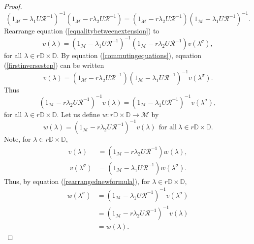 \documentclass[10pt,a4paper]{amsart}
\begin{document}
\begin{proof}
\begin{equation}\label{commutingequations}
(1_{\mathcal{M}}-\lambda_{1}U\mathcal{R}^{-1})^{-1}(1_{\mathcal{M}}-r\lambda_{2}U\mathcal{R}^{-1}) = (1_{\mathcal{M}}-r\lambda_{2}U\mathcal{R}^{-1})(1_{\mathcal{M}}-\lambda_{1}U\mathcal{R}^{-1})^{-1}.
\end{equation}
Rearrange equation (\ref{equalitybetweenextension}) to
\begin{equation}\label{firstinversestep}
v({\lambda}) = (1_{\mathcal{M}}-\lambda_{1}U\mathcal{R}^{-1})^{-1}(1_{\mathcal{M}}-r\lambda_{2}U\mathcal{R}^{-1})v({\lambda}^{\sigma}),
\end{equation}
for all $\lambda \in r\mathbb{D}\times\mathbb{D}$.
By equation (\ref{commutingequations}), equation (\ref{firstinversestep}) can be written
\begin{equation}\label{rearrangednewformula-1}
 v({\lambda}) =  (1_{\mathcal{M}}-r\lambda_{2}U\mathcal{R}^{-1})(1_{\mathcal{M}}-\lambda_{1}U\mathcal{R}^{-1})^{-1}v({\lambda}^{\sigma}).
\end{equation}
Thus
\begin{equation}\label{rearrangednewformula}
 (1_{\mathcal{M}}-r\lambda_{2}U\mathcal{R}^{-1})^{-1}v({\lambda}) = (1_{\mathcal{M}}-\lambda_{1}U\mathcal{R}^{-1})^{-1}v({\lambda}^{\sigma}),
\end{equation}
for all $\lambda \in r\mathbb{D}\times\mathbb{D}$.
Let us define $w: r\mathbb{D}\times\mathbb{D}\rightarrow \mathcal{M}$ by
\begin{equation}\label{wequation}
w(\lambda)=(1_{\mathcal{M}}-r\lambda_{2}U\mathcal{R}^{-1})^{-1}v({\lambda})~~\text{for all}~\lambda \in r\mathbb{D}\times \mathbb{D}.
\end{equation}
Note, for $\lambda \in r \mathbb{D}\times\mathbb{D}$,
\begin{align}
v({\lambda}) &= (1_{\mathcal{M}}-r\lambda_{2}U\mathcal{R}^{-1})w(\lambda) \label{vlambda},\\
~v({\lambda}^{\sigma}) &= (1_{\mathcal{M}}-\lambda_{1}U\mathcal{R}^{-1})w(\lambda^{\sigma}) \label{vlambdasigma}.
\end{align}
Thus, by equation (\ref{rearrangednewformula}), for $\lambda \in r \mathbb{D} \times \mathbb{D}$,
\begin{align}
w({\lambda^{\sigma}}) &= (1_{\mathcal{M}}-\lambda_{1}U\mathcal{R}^{-1})^{-1}v({\lambda}^{\sigma}) \nonumber \\
& =  (1_{\mathcal{M}}-r\lambda_{2}U\mathcal{R}^{-1})^{-1}v({\lambda}) \nonumber \\
& = w(\lambda). \label{wsigma}

\end{align}
\end{proof}
\end{document}
